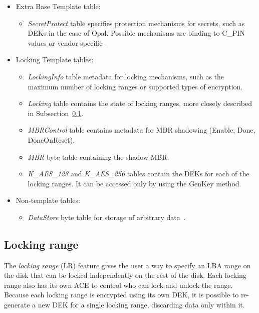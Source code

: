 \begin{itemize}
    \item Extra Base Template table:
    \begin{itemize}
        \item \emph{SecretProtect} table specifies protection mechanisms for secrets, such as DEKs in the case of Opal. Possible mechanisms are binding to C\_PIN values or vendor specific~\cite{tcg-secrets}.
    \end{itemize}
    \item Locking Template tables:
    \begin{itemize}
        \item \emph{LockingInfo} table metadata for locking mechanisms, such as the maximum number of locking ranges or supported types of encryption. 
        \item \emph{Locking} table contains the state of locking ranges, more closely described in Subsection~\ref{locking_range}.
        \item \emph{MBRControl} table contains metadata for MBR shadowing (Enable, Done, DoneOnReset).
        \item \emph{MBR} byte table containing the shadow MBR.
        \item \emph{K\_AES\_128} and \emph{K\_AES\_256} tables contain the DEKs for each of the locking ranges. It can be accessed only by using the GenKey method.
    \end{itemize}
    \item Non-template tables:
    \begin{itemize}
        \item \emph{DataStore} byte table for storage of arbitrary data~\cite{tcg-additional-datastore}.
    \end{itemize}
\end{itemize}

\subsection{Locking range}
\label{locking_range}

The \emph{locking range} (LR) feature gives the user a way to specify an LBA range on the disk that can be locked independently on the rest of the disk. Each locking range also has its own ACE to control who can lock and unlock the range. Because each locking range is encrypted using its own DEK, it is possible to re-generate a new DEK for a single locking range, discarding data only within it.


